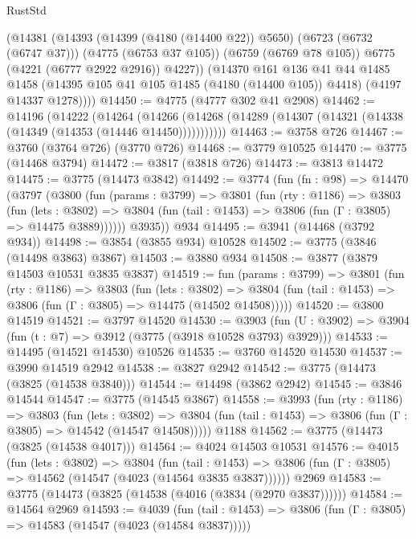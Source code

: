 \begin{lexlean}{RustStd}
\begin{coremodule}
{\begin{coremodule}
{{{{{{{{{{{{{{{{{{{{{{{{{{{{{{{        (@14381
          (@14393
            (@14399 (@4180 (@14400 @22)) @5650)
            (@6723 (@6732 (@6747 @37)))
            (@4775 (@6753 @37 @105))
            (@6759 (@6769 @78 @105))
            @6775
            (@4221 (@6777 @2922 @2916))
            @4227))
        (@14370
          @161
          @136
          @41
          @44
          @1485
          @1458
          (@14395 @105 @41 @105 @1485 (@4180 (@14400 @105)) @4418)
          (@4197 @14337 @1278))))
@14450 := @4775 (@4777 @302 @41 @2908)
@14462 := @14196
    (@14222
      (@14264
        (@14266 (@14268 (@14289 (@14307 (@14321 (@14338 (@14349 (@14353 (@14446 @14450)))))))))))
@14463 := @3758 @726
@14467 := @3760 (@3764 @726) (@3770 @726)
@14468 := @3779 @10525
@14470 := @3775 (@14468 @3794)
@14472 := @3817 (@3818 @726)
@14473 := @3813 @14472
@14475 := @3775 (@14473 @3842)
@14492 := @3774
    (fun (fn : @98) =>
    @14470
      (@3797
        (@3800
          (fun (params : @3799) =>
          @3801
            (fun (rty : @1186) =>
            @3803
              (fun (lets : @3802) =>
              @3804 (fun (tail : @1453) => @3806 (fun (Γ : @3805) => @14475 @3889))))))
        @3935))
    @934
@14495 := @3941 (@14468 (@3792 @934))
@14498 := @3854 (@3855 @934) @10528
@14502 := @3775 (@3846 (@14498 @3863) @3867)
@14503 := @3880 @934
@14508 := @3877 (@3879 @14503 @10531 @3835 @3837)
@14519 := fun (params : @3799) =>
  @3801
    (fun (rty : @1186) =>
    @3803
      (fun (lets : @3802) =>
      @3804 (fun (tail : @1453) => @3806 (fun (Γ : @3805) => @14475 (@14502 @14508)))))
@14520 := @3800 @14519
@14521 := @3797 @14520
@14530 := @3903
    (fun (U : @3902) => @3904 (fun (t : @7) => @3912 (@3775 (@3918 @10528 @3793) @3929)))
@14533 := @14495 (@14521 @14530) @10526
@14535 := @3760 @14520 @14530
@14537 := @3990 @14519 @2942
@14538 := @3827 @2942
@14542 := @3775 (@14473 (@3825 (@14538 @3840)))
@14544 := @14498 (@3862 @2942)
@14545 := @3846 @14544
@14547 := @3775 (@14545 @3867)
@14558 := @3993
    (fun (rty : @1186) =>
    @3803
      (fun (lets : @3802) =>
      @3804 (fun (tail : @1453) => @3806 (fun (Γ : @3805) => @14542 (@14547 @14508)))))
    @1188
@14562 := @3775 (@14473 (@3825 (@14538 @4017)))
@14564 := @4024 @14503 @10531
@14576 := @4015
    (fun (lets : @3802) =>
    @3804
      (fun (tail : @1453) =>
      @3806 (fun (Γ : @3805) => @14562 (@14547 (@4023 (@14564 @3835 @3837))))))
    @2969
@14583 := @3775 (@14473 (@3825 (@14538 (@4016 (@3834 (@2970 @3837))))))
@14584 := @14564 @2969
@14593 := @4039
    (fun (tail : @1453) => @3806 (fun (Γ : @3805) => @14583 (@14547 (@4023 (@14584 @3837)))))
}}}}}}}}}}}}}}}}}}}}}}}}}}}}}}}
\end{coremodule}}
\end{coremodule}
\end{lexlean}
